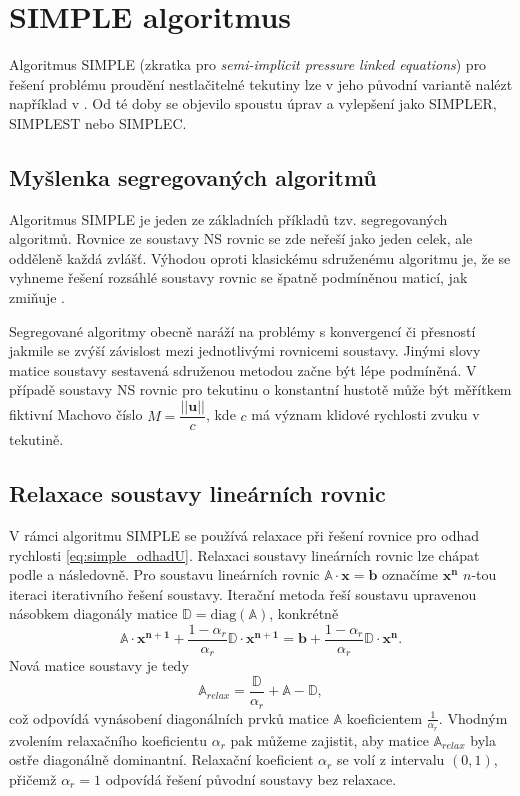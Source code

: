 \section{SIMPLE algoritmus}\label{sec:simple}

Algoritmus SIMPLE (zkratka pro \textit{semi-implicit pressure linked equations}) pro řešení problému proudění nestlačitelné tekutiny lze v jeho původní variantě nalézt například v \cite{patankar1983calculation}. Od té doby se objevilo spoustu úprav a vylepšení jako SIMPLER\cite{anderson1997computational}, SIMPLEST nebo SIMPLEC\cite{van1984enhancements}. 

\subsection{Myšlenka segregovaných algoritmů}
Algoritmus SIMPLE je jeden ze základních příkladů tzv. segregovaných algoritmů. Rovnice ze soustavy NS rovnic se zde neřeší jako jeden celek, ale odděleně každá zvlášť. Výhodou oproti klasickému sdruženému algoritmu je, že se vyhneme řešení rozsáhlé soustavy rovnic se špatně podmíněnou maticí, jak zmiňuje \cite{furst2020mko2}. 

Segregované algoritmy obecně naráží na problémy s konvergencí či přesností jakmile se zvýší závislost mezi jednotlivými rovnicemi soustavy. Jinými slovy matice soustavy sestavená sdruženou metodou začne být lépe podmíněná. V případě soustavy NS rovnic pro tekutinu o konstantní hustotě může být měřítkem fiktivní Machovo číslo $ M = \dfrac{||\mathbf{u}||}{c} $, kde $ c $ má význam klidové rychlosti zvuku v tekutině. 

\subsection{Relaxace soustavy lineárních rovnic}
V rámci algoritmu SIMPLE se používá relaxace\cite{furst2020mko2} při řešení rovnice pro odhad rychlosti \ref{eq:simple_odhadU}. Relaxaci soustavy lineárních rovnic lze chápat podle \cite{saad2003iterative} a \cite{furst2020mko2} následovně.
Pro soustavu lineárních rovnic $\mathbb{A}\cdot\mathbf{x}=\mathbf{b} $ označíme $ \mathbf{x^n} $ $ n $-tou iteraci iterativního řešení soustavy. Iterační metoda řeší soustavu upravenou násobkem diagonály matice $ \mathbb{D}=\mathrm{diag}(\mathbb{A}) $, konkrétně
\begin{equation}
\mathbb{A}\cdot\mathbf{x^{n+1}}
+\dfrac{1-\alpha_r}{\alpha_r}\mathbb{D}\cdot\mathbf{x^{n+1}}
=
\mathbf{b}+\dfrac{1-\alpha_r}{\alpha_r}\mathbb{D}\cdot\mathbf{x^n}.
\end{equation}
Nová matice soustavy je tedy
\begin{equation}\label{key}
\mathbb{A}_{relax}=\dfrac{\mathbb{D}}{\alpha_r}+\mathbb{A}-\mathbb{D},
\end{equation}
což odpovídá vynásobení diagonálních prvků matice $ \mathbb{A} $ koeficientem $ \frac{1}{\alpha_r} $. Vhodným zvolením relaxačního koeficientu $ \alpha_r $ pak můžeme zajistit, aby matice $ \mathbb{A}_{relax} $ byla ostře diagonálně dominantní. Relaxační koeficient $ \alpha_r $ se volí z intervalu $ (0,1) $, přičemž $ \alpha_r=1 $ odpovídá řešení původní soustavy bez relaxace.

